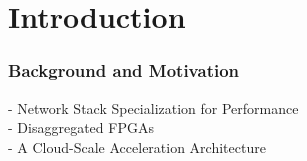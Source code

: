 \section{Introduction}
\begin{frame}
  \frametitle{Background and Motivation}

- Network Stack Specialization for Performance\\
- Disaggregated FPGAs\\
- A Cloud-Scale Acceleration Architecture

\end{frame}



